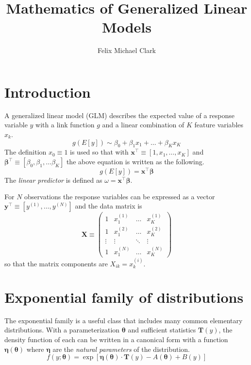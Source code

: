 \documentclass{article}
\title{Mathematics of Generalized Linear Models}
\author{Felix Michael Clark}
\newcommand{\bbeta}{\boldsymbol{\beta}}
\begin{document}
\maketitle

\section{Introduction}

A generalized linear model (GLM) describes the expected value of a response
variable \(y\) with a link function \(g\) and a linear combination of \(K\) feature
variables \(x_k\).
\[ g(E[y]) \sim \beta_0 + \beta_1 x_1 + \ldots + \beta_K x_K \]
The definition \(x_0 \equiv 1\) is used so that with \(\mathbf{x}^\intercal \equiv [1, x_1,
	\ldots, x_K]\) and \(\bbeta^\intercal \equiv [\beta_0, \beta_1, \ldots
	\beta_K]\) the above equation is written as the following.
\[ g(E[y]) = \mathbf{x}^\intercal \bbeta\]
The \emph{linear predictor} is defined as \(\omega = \mathbf{x}^\intercal
\bbeta \).

For \(N\) observations the response variables can be expressed as a vector
\(\mathbf{y}^\intercal \equiv [y^{(1)}, \ldots, y^{(N)}]\) and the data matrix is
\begin{equation}
	\mathbf{X} \equiv \begin{pmatrix}
		1      & x_1^{(1)} & \ldots & x_K^{(1)} \\
		1      & x_1^{(2)} & \ldots & x_K^{(2)} \\
		\vdots & \vdots    & \ddots & \vdots    \\
		1      & x_1^{(N)} & \ldots & x_K^{(N)}
	\end{pmatrix}
\end{equation}
so that the matrix components are \(X_{ik} = x_{k}^{(i)}\).

\section{Exponential family of distributions}

The exponential family is a useful class that includes many common elementary
distributions. With a parameterization \(\boldsymbol{\theta}\) and sufficient
statistics \(\mathbf{T}(y)\), the density function of each can be written in a
canonical form with a function \(\boldsymbol{\eta}(\boldsymbol{\theta})\) where
\(\boldsymbol{\eta}\) are the \emph{natural parameters} of the distribution.
\[ f(y; \boldsymbol{\theta}) = \exp\left[ \boldsymbol{\eta}(\boldsymbol{\theta}) \cdot \mathbf{T}(y) - A(\boldsymbol{\theta}) + B(y) \right] \]
\end{document}
